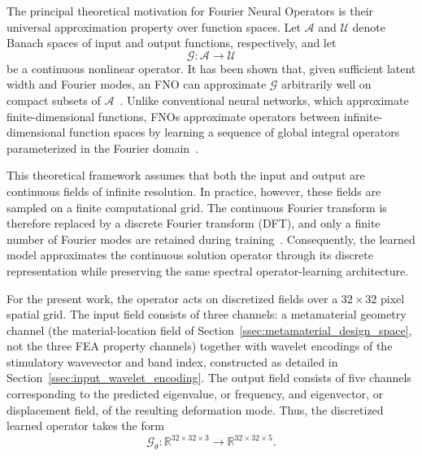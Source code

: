 \documentclass[preprint,review,12pt,numafflabel]{elsarticle}
\begin{document}
The principal theoretical motivation for Fourier Neural Operators is their universal approximation property over function spaces. Let $\mathcal{A}$ and $\mathcal{U}$ denote Banach spaces of input and output functions, respectively, and let
\begin{equation}
\mathcal{G}:\mathcal{A}\rightarrow\mathcal{U}
\end{equation}
be a continuous nonlinear operator. It has been shown that, given sufficient latent width and Fourier modes, an FNO can approximate $\mathcal{G}$ arbitrarily well on compact subsets of $\mathcal{A}$~\cite{kovachki2023neural}. Unlike conventional neural networks, which approximate finite-dimensional functions, FNOs approximate operators between infinite-dimensional function spaces by learning a sequence of global integral operators parameterized in the Fourier domain~\cite{li2021fno}.

This theoretical framework assumes that both the input and output are continuous fields of infinite resolution. In practice, however, these fields are sampled on a finite computational grid. The continuous Fourier transform is therefore replaced by a discrete Fourier transform (DFT), and only a finite number of Fourier modes are retained during training~\cite{li2021fno,qin2024spectralfno}. Consequently, the learned model approximates the continuous solution operator through its discrete representation while preserving the same spectral operator-learning architecture.

For the present work, the operator acts on discretized fields over a $32\times32$ pixel spatial grid. The input field consists of three channels: a metamaterial geometry channel (the material-location field of Section~\ref{ssec:metamaterial_design_space}, not the three FEA property channels) together with wavelet encodings of the stimulatory wavevector and band index, constructed as detailed in Section~\ref{ssec:input_wavelet_encoding}. The output field consists of five channels corresponding to the predicted eigenvalue, or frequency, and eigenvector, or displacement field, of the resulting deformation mode. Thus, the discretized learned operator takes the form
\begin{equation}
\mathcal{G}_{\theta}:
\mathbb{R}^{32\times32\times3}
\rightarrow
\mathbb{R}^{32\times32\times5}.
\end{equation}
\end{document}
